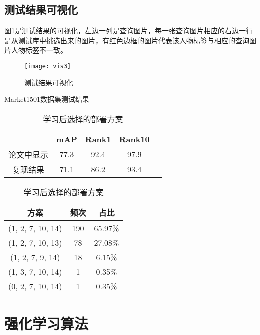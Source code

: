 \subsection{测试结果可视化}

图\ref{fig:testvis}是测试结果的可视化，左边一列是查询图片，每一张查询图片相应的右边一行是从测试库中挑选出来的图片，有红色边框的图片代表该人物标签与相应的查询图片人物标签不一致。

\begin{figure}
\centering
\texttt{[image: vis3]}
\caption{测试结果可视化}
\label{fig:testvis}
\end{figure}

\begin{table}[]
\begin{minipage}{0.5\textwidth}
        \centering
        \caption{Market1501数据集测试结果}
        \label{tab:test}
        \begin{tabular}{@{}ccccc@{}}
        \toprule
                & mAP   & Rank1 & Rank10 \\ \midrule
        论文中显示  & 77.3  & 92.4  & 97.9   \\
        复现结果   & 71.1  & 86.2  & 93.4   \\ \bottomrule
        \end{tabular}
\end{minipage}
\begin{minipage}{0.5\textwidth}
        \centering
        \caption{学习后选择的部署方案}
        \label{tab:rlresult}
        \begin{tabular}{@{}ccc@{}}
        \toprule
        方案               & 频次  & 占比      \\ \midrule
        (1, 2, 7, 10, 14) & 190 & 65.97\% \\
        (1, 2, 7, 10, 13) & 78  & 27.08\% \\
        (1, 2, 7, 9, 14)  & 18  & 6.15\%  \\
        (1, 3, 7, 10, 14) & 1   & 0.35\%  \\
        (0, 2, 7, 10, 14) & 1   & 0.35\%  \\ \bottomrule
        \end{tabular}
\end{minipage}%
\end{table}

\section{强化学习算法}

